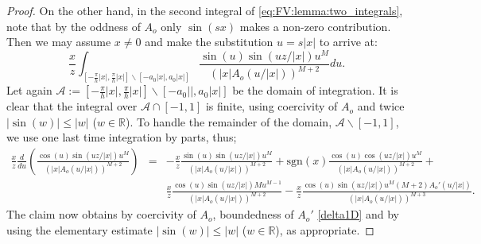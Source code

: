 \documentclass[pdftex,oneside,11pt,reqno]{amsart}
\theoremstyle{definition}
\theoremstyle{theorem}
\theoremstyle{remark}
\numberwithin{equation}{section}
\numberwithin{definition}{section}
\begin{document}
\begin{proof}
On the other hand, in the second integral of  \eqref{eq:FV:lemma:two_integrals}, note that by the oddness of $A_o$ only $\sin(sx)$ makes a non-zero contribution. Then we may assume $x\ne 0$ and make the substitution $u=s\vert x\vert$ to arrive at: $$\frac{x}{z}\int_{[-\frac{\pi}{h}\vert x\vert,\frac{\pi}{h}\vert x\vert]\backslash [-a_0\vert x\vert,a_0\vert x\vert]}\frac{\sin(u)\sin(uz/\vert x\vert)u^M}{(\vert x\vert A_o(u/\vert x\vert))^{M+2}}du.$$ Let again $\mathcal{A}:=[-\frac{\pi}{h}\vert x\vert,\frac{\pi}{h}\vert x\vert]\backslash [-a_0\vert \vert,a_0\vert x\vert]$ be the domain of integration. It is clear that the integral over $\mathcal{A}\cap [-1,1]$ is finite, using coercivity of $A_o$ and twice $\vert \sin(w)\vert\leq \vert w\vert$ ($w\in \mathbb{R}$). To handle the remainder of the domain, $\mathcal{A}\backslash [-1,1]$, we use one last time integration by parts, thus;
\footnotesize
\begin{eqnarray*}
 \frac{x}{z}\frac{d}{du}\left(\frac{\cos(u)\sin(uz/\vert x\vert)u^M}{(\vert x\vert A_o(u/\vert x\vert))^{M+2}}\right)&=&-\frac{x}{z}\frac{\sin(u)\sin(uz/\vert x\vert)u^M}{(\vert x\vert A_o(u/\vert x\vert))^{M+2}}+\mathrm{sgn}(x)\frac{\cos(u)\cos(uz/\vert x\vert)u^M}{(\vert x\vert A_o(u/\vert x\vert))^{M+2}}+\\
&&\frac{x}{z}\frac{\cos(u)\sin(uz/\vert x\vert)Mu^{M-1}}{(\vert x\vert A_o(u/\vert x\vert))^{M+2}}-\frac{x}{z}\frac{\cos(u)\sin(uz/\vert x\vert)u^M(M+2)A_o'(u/\vert x\vert)}{(\vert x\vert A_o(u/\vert x\vert))^{M+3}}.
\end{eqnarray*}
\normalsize
The claim now obtains by coercivity of $A_o$, boundedness of $A_o'$ \ref{delta1D} and by using the elementary estimate $\vert \sin(w)\vert\leq \vert w\vert$ ($w\in \mathbb{R}$), as appropriate.  
\end{proof}
\end{document}
